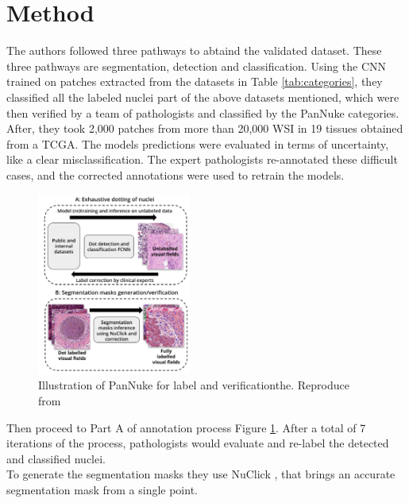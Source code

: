\documentclass[target=bach,aauheader=,style=]{thud}
\begin{document}
\section{Method}
The authors followed three pathways to abtaind the validated dataset. These three pathways are segmentation, detection and classification. Using the CNN trained on patches extracted from the datasets in Table \ref{tab:categories}, they classified all the labeled nuclei part of the above datasets mentioned, which were then verified by a team of pathologists and classified by the PanNuke categories.\\
After, they took 2,000 patches from more than 20,000 WSI in 19 tissues obtained from a TCGA.
The models predictions were evaluated in terms of uncertainty, like a clear misclassification. The expert pathologists re-annotated these difficult cases, and the corrected annotations were used to retrain the models. 
\begin{figure}[h] %
    \centering
    \includegraphics[width=0.45\textwidth]{imgs/pannuke_annotations.jpg}
    \caption{Illustration of PanNuke for label and verificationthe. Reproduce from \cite{gamper2020pannuke}}
    \label{fig:process-ver}
\end{figure}
Then proceed to Part A of annotation process Figure \ref{fig:process-ver}. After a total of 7 iterations of the process, pathologists would evaluate and re-label the detected and classified nuclei.\\
To generate the segmentation masks they use NuClick \cite{jahanifar2019nuclick}, that brings an accurate segmentation mask from a single point. 
\end{document}
